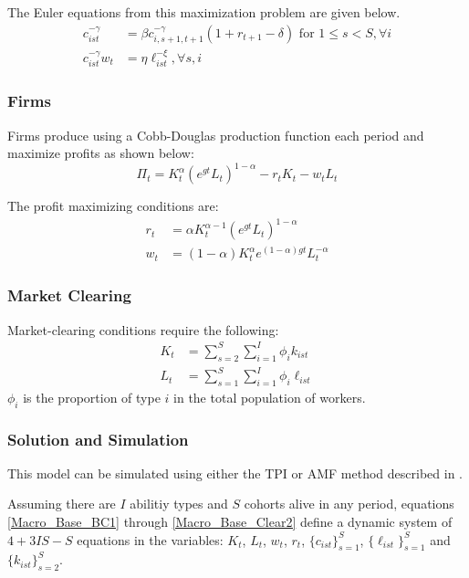 \documentclass[letterpaper,12pt]{article}
\theoremstyle{definition}
\numberwithin{equation}{section}
\begin{document}
\begin{spacing}{1.5}
      The Euler equations from this maximization problem are given below.
      \begin{align}
      c_{ist}^{-\gamma} & = \beta c_{i,s+1,t+1}^{-\gamma}(1+r_{t+1}-\delta) \text{     for } 1\le s<S,\forall i \label{Macro_Base_Euler1}\\
      c_{ist}^{-\gamma} w_t & = \eta \ell_{ist}^{-\xi}, \forall s,i \label{Macro_Base_Euler2}
      \end{align}

    \subsubsection{Firms}
      Firms produce using a Cobb-Douglas production function each period and maximize profits as shown below:
      \begin{equation}
      \Pi_t = K_t^\alpha (e^{gt}L_t)^{1-\alpha} - r_tK_t - w_tL_t \label{Macro_Base_Profit} \nonumber
      \end{equation}

      The profit maximizing conditions are:
      \begin{align}
      r_t & = \alpha K_t^{\alpha-1}(e^{gt}L_t)^{1-\alpha} \label{Macro_Base_FirmFOC1}\\
      w_t & = (1-\alpha) K_t^{\alpha}e^{(1-\alpha)gt}L_t^{-\alpha} \label{Macro_Base_FirmFOC2}
      \end{align}

    \subsubsection{Market Clearing}
      Market-clearing conditions require the following:
      \begin{align}
      K_t & = \sum_{s=2}^S \sum_{i=1}^I \phi_i k_{ist} \label{Macro_Base_Clear1}\\
      L_t & = \sum_{s=1}^S \sum_{i=1}^I \phi_i \ell_{ist} \label{Macro_Base_Clear2}
      \end{align}
      $\phi_i$ is the proportion of type $i$ in the total population of workers.

    \subsubsection{Solution and Simulation}
      This model can be simulated using either the TPI or AMF method described in \citet{EvansPhillips2014}.

      Assuming there are $I$ abilitiy types and $S$ cohorts alive in any period, equations \eqref{Macro_Base_BC1} through \eqref{Macro_Base_Clear2} define a dynamic system of $4+3IS - S$ equations in the variables: $K_t$, $L_t$, $w_t$, $r_t$, $\{c_{ist}\}_{s=1}^S$, $\{\ell_{ist}\}_{s=1}^S$ and $\{k_{ist}\}_{s=2}^S$.


\end{spacing}
\end{document}
